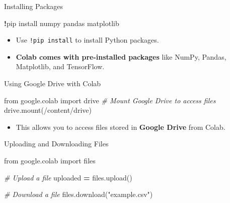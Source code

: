\documentclass[
  ignorenonframetext,
]{beamer}
\newenvironment{Shaded}{\begin{snugshade}}{\end{snugshade}}
\newcommand{\CommentTok}[1]{\textcolor[rgb]{0.56,0.35,0.01}{\textit{#1}}}
\newcommand{\ImportTok}[1]{#1}
\newcommand{\NormalTok}[1]{#1}
\newcommand{\OperatorTok}[1]{\textcolor[rgb]{0.81,0.36,0.00}{\textbf{#1}}}
\newcommand{\StringTok}[1]{\textcolor[rgb]{0.31,0.60,0.02}{#1}}
\providecommand{\tightlist}{%
  \setlength{\itemsep}{0pt}\setlength{\parskip}{0pt}}
\begin{document}
\begin{frame}[fragile]{Installing Packages}
\label{installing-packages}

\begin{Shaded}
\begin{Highlighting}[]
\OperatorTok{!}\NormalTok{pip install numpy pandas matplotlib}
\end{Highlighting}
\end{Shaded}

\begin{itemize}
\tightlist
\item
  Use \texttt{!pip\ install} to install Python packages.
\item
  \textbf{Colab comes with pre-installed packages} like NumPy, Pandas,
  Matplotlib, and TensorFlow.
\end{itemize}
\end{frame}

\begin{frame}[fragile]{Using Google Drive with Colab}
\label{using-google-drive-with-colab}

\begin{Shaded}
\begin{Highlighting}[]
\ImportTok{from}\NormalTok{ google.colab }\ImportTok{import}\NormalTok{ drive}
\CommentTok{\# Mount Google Drive to access files}
\NormalTok{drive.mount(}\StringTok{\textquotesingle{}/content/drive\textquotesingle{}}\NormalTok{)}
\end{Highlighting}
\end{Shaded}

\begin{itemize}
\tightlist
\item
  This allows you to access files stored in \textbf{Google Drive} from
  Colab.
\end{itemize}
\end{frame}

\begin{frame}[fragile]{Uploading and Downloading Files}
\label{uploading-and-downloading-files}

\begin{Shaded}
\begin{Highlighting}[]
\ImportTok{from}\NormalTok{ google.colab }\ImportTok{import}\NormalTok{ files}

\CommentTok{\# Upload a file}
\NormalTok{uploaded }\OperatorTok{=}\NormalTok{ files.upload()}

\CommentTok{\# Download a file}
\NormalTok{files.download(}\StringTok{"example.csv"}\NormalTok{)}
\end{Highlighting}
\end{Shaded}
\end{frame}
\end{document}
